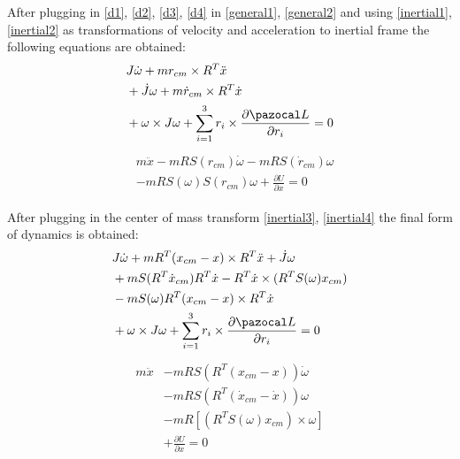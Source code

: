 After plugging in \ref{d1}, \ref{d2}, \ref{d3}, \ref{d4} in \ref{general1}, \ref{general2} and using \ref{inertial1}, \ref{inertial2} as transformations of velocity and acceleration to inertial frame the following equations are obtained:
\begin{align}
	\begin{split}
		& J\dot{\omega} + m r_{cm} \times R^T \ddot{x} \\
		&+ \dot{J} \omega + m\dot{r}_{cm} \times R^T \dot{x} \\
		&+ \omega \times J\omega + \sum_{i=1}^{3} r_i \times \frac{\partial \La}{\partial r_i} = 0
	\end{split}
\end{align}
\begin{align}
	\begin{split}
		& m\ddot{x} - mRS(r_{cm}) \dot{\omega} - mRS(\dot{r}_{cm})\omega\\
		&-mRS(\omega)S(r_{cm})\omega + \frac{\partial U}{\partial x} = 0
	\end{split}
\end{align}

After plugging in the center of mass transform \ref{inertial3}, \ref{inertial4} the final form of dynamics is obtained:
\begin{align}
	\begin{split}
		 & J\dot{\omega} + mR^T(x_{cm} - x) \times R^T\ddot{x} + \dot{J}\omega \\
		 & + mS(R^T\dot{x}_{cm})R^T\dot{x} - R^T\dot{x} \times (R^TS(\omega)x_{cm}) \\
		 & - mS(\omega)R^T(x_{cm} - x) \times R^T \dot{x} \\
		 & + \omega \times J\omega  + \sum_{i=1}^{3} r_i \times \frac{\partial \La}{\partial r_i} = 0
	\end{split}
\end{align}
\begin{align}
	\begin{split}
		m \ddot{x} &- mRS(R^T(x_{cm} - x))\dot{\omega} \\
		& - mRS(R^T(\dot{x}_{cm} - \dot{x})) \omega \\
		& - mR[(R^TS(\omega)x_{cm}) \times \omega] \\
		& + \frac{\partial U}{\partial x} = 0
	\end{split}
\end{align}
